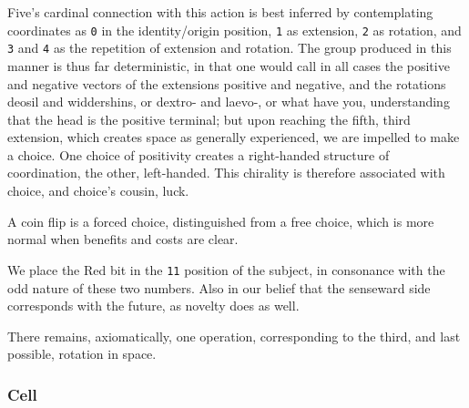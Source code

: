\documentclass[twoside]{article}
\begin{document}
Five's cardinal connection with this action is best inferred by contemplating coordinates as \texttt{0} in the identity/origin position, \texttt{1} as extension, \texttt{2} as rotation, and \texttt{3} and \texttt{4} as the repetition of extension and rotation. The group produced in this manner is thus far deterministic, in that one would call in all cases the positive and negative vectors of the extensions positive and negative, and the rotations deosil and widdershins, or dextro- and laevo-, or what have you, understanding that the head is the positive terminal; but upon reaching the fifth, third extension, which creates space as generally experienced, we are impelled to make a choice. One choice of positivity creates a right-handed structure of coordination, the other, left-handed. This chirality is therefore associated with choice, and choice's cousin, luck.

A coin flip is a forced choice, distinguished from a free choice, which is more normal when benefits and costs are clear.

We place the Red bit in the \texttt{11} position of the subject, in consonance with the odd nature of these two numbers. Also in our belief that the senseward side corresponds with the future, as novelty does as well.

There remains, axiomatically, one operation, corresponding to the third, and last possible, rotation in space.

\subsubsection{Cell}
\end{document}
